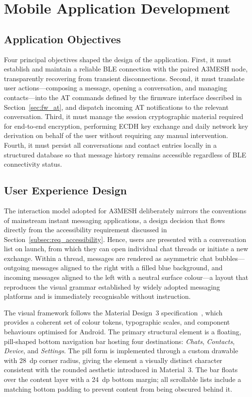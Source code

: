 \documentclass[english,bachelor]{tfgitic}[2026/01/22]
\begin{document}
\section{Mobile Application Development}
\label{ch:mobileapp}

\subsection{Application Objectives}

Four principal objectives shaped the design of the application. First, it must establish and maintain a reliable BLE connection with the paired A3MESH node, transparently recovering from transient disconnections. Second, it must translate user actions---composing a message, opening a conversation, and managing contacts---into the AT commands defined by the firmware interface described in Section~\ref{sec:fw_at}, and dispatch incoming AT notifications to the relevant conversation. Third, it must manage the session cryptographic material required for end-to-end encryption, performing ECDH key exchange and daily network key derivation on behalf of the user without requiring any manual intervention. Fourth, it must persist all conversations and contact entries locally in a structured database so that message history remains accessible regardless of BLE connectivity status.

\subsection{User Experience Design}

The interaction model adopted for A3MESH deliberately mirrors the conventions of mainstream instant messaging applications, a design decision that flows directly from the accessibility requirement discussed in Section~\ref{subsec:req_accessibility}. Hence, users are presented with a conversation list on launch, from which they can open individual chat threads or initiate a new exchange. Within a thread, messages are rendered as asymmetric chat bubbles---outgoing messages aligned to the right with a filled blue background, and incoming messages aligned to the left with a neutral surface colour---a layout that reproduces the visual grammar established by widely adopted messaging platforms and is immediately recognisable without instruction.

The visual framework follows the Material Design~3 specification~\cite{google2024material3}, which provides a coherent set of colour tokens, typographic scales, and component behaviours optimised for Android. The primary structural element is a floating, pill-shaped bottom navigation bar hosting four destinations: \emph{Chats}, \emph{Contacts}, \emph{Device}, and \emph{Settings}. The pill form is implemented through a custom drawable with 28~dp corner radius, giving the element a visually distinct character consistent with the rounded aesthetic introduced in Material~3. The bar floats over the content layer with a 24~dp bottom margin; all scrollable lists include a matching bottom padding to prevent content from being obscured behind it.
\end{document}
